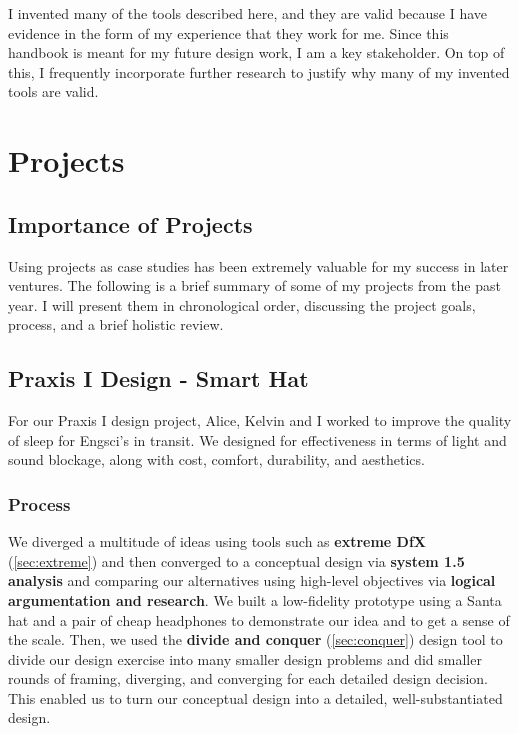 \documentclass[a4paper,12pt]{article}
\begin{document}
I invented many of the tools described here, and they are valid because I have evidence in the form of my experience that they work for me. Since this handbook is meant for my future design work, I am a key stakeholder. On top of this, I frequently incorporate further research to justify why many of my invented tools are valid.




\section{Projects}
\subsection{Importance of Projects}
Using projects as case studies has been extremely valuable for my success in later ventures. The following is a brief summary of some of my projects from the past year. I will present them in chronological order, discussing the project goals, process, and a brief holistic review.

\subsection{Praxis I Design - Smart Hat}
\label{sec:hat}
For our Praxis I design project, Alice, Kelvin and I worked to improve the quality of sleep for Engsci’s in transit. We designed for effectiveness in terms of light and sound blockage, along with cost, comfort, durability, and aesthetics.

\subsubsection{Process}
We diverged a multitude of ideas using tools such as \textbf{extreme DfX} (\ref{sec:extreme}) and then converged to a conceptual design via \textbf{system 1.5 analysis} and comparing our alternatives using high-level objectives via \textbf{logical argumentation and research}. We built a low-fidelity prototype using a Santa hat and a pair of cheap headphones to demonstrate our idea and to get a sense of the scale. Then, we used the \textbf{divide and conquer} (\ref{sec:conquer}) design tool to divide our design exercise into many smaller design problems and did smaller rounds of framing, diverging, and converging for each detailed design decision. This enabled us to turn our conceptual design into a detailed, well-substantiated design.
\end{document}
